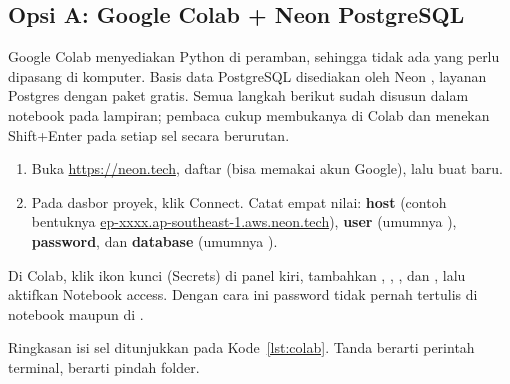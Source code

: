 \subsection{Opsi A: Google Colab + Neon PostgreSQL}\label{sec:opsiA}
Google Colab \citep{colab} menyediakan Python di peramban, sehingga tidak ada yang perlu dipasang di komputer. Basis data PostgreSQL disediakan oleh Neon \citep{neon}, layanan Postgres  dengan paket gratis. Semua langkah berikut sudah disusun dalam notebook  pada lampiran; pembaca cukup membukanya di Colab dan menekan \textsf{Shift+Enter} pada setiap sel secara berurutan.

\begin{enumerate}[nosep]
    \item Buka \url{https://neon.tech}, daftar (bisa memakai akun Google), lalu buat  baru.
    \item Pada dasbor proyek, klik \textsf{Connect}. Catat empat nilai: \textbf{host} (contoh bentuknya \url{ep-xxxx.ap-southeast-1.aws.neon.tech}), \textbf{user} (umumnya ), \textbf{password}, dan \textbf{database} (umumnya ).
\end{enumerate}

Di Colab, klik ikon kunci (\textsf{Secrets}) di panel kiri, tambahkan , , , dan , lalu aktifkan \textsf{Notebook access}. Dengan cara ini password tidak pernah tertulis di notebook maupun di .

Ringkasan isi sel ditunjukkan pada Kode~\ref{lst:colab}. Tanda \kode{!} berarti perintah terminal,  berarti pindah folder.

